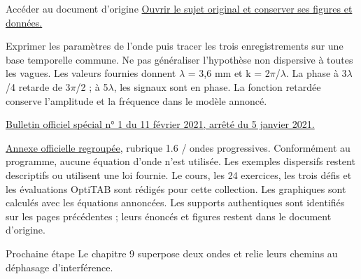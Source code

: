 \begin{loi}{Accéder au document d’origine}
\href{https://mpsi.schleck.ovh/fichiers/devoirs/2025-2026/ds5_molecules_ondes_cinematique.pdf}{Ouvrir le sujet original et conserver ses figures et données.}
\end{loi}
Exprimer les paramètres de l’onde puis tracer les trois enregistrements sur une base temporelle commune. Ne pas généraliser l’hypothèse non dispersive à toutes les vagues.
Les valeurs fournies donnent \ensuremath{\lambda} = 3,6 mm et k = 2\ensuremath{\pi}/\ensuremath{\lambda}. La phase à 3\ensuremath{\lambda}/4 retarde de 3\ensuremath{\pi}/2 ; à 5\ensuremath{\lambda}, les signaux sont en phase. La fonction retardée conserve l’amplitude et la fréquence dans le modèle annoncé.

\href{https://www.education.gouv.fr/bo/21/Special1/ESRS2035779A.htm}{Bulletin officiel spécial n° 1 du 11 février 2021, arrêté du 5 janvier 2021.}\par
\href{https://cache.media.education.gouv.fr/file/SPE1-MEN-MESRI-4-2-2021/64/8/spe779_annexe_1373648.pdf}{Annexe officielle regroupée}, rubrique 1.6 / ondes progressives. Conformément au programme, aucune équation d’onde n’est utilisée. Les exemples dispersifs restent descriptifs ou utilisent une loi fournie.
Le cours, les 24 exercices, les trois défis et les évaluations OptiTAB sont rédigés pour cette collection. Les graphiques sont calculés avec les équations annoncées. Les supports authentiques sont identifiés sur les pages précédentes ; leurs énoncés et figures restent dans le document d’origine.
\begin{methode}{Prochaine étape}
Le chapitre 9 superpose deux ondes et relie leurs chemins au déphasage d’interférence.
\end{methode}

